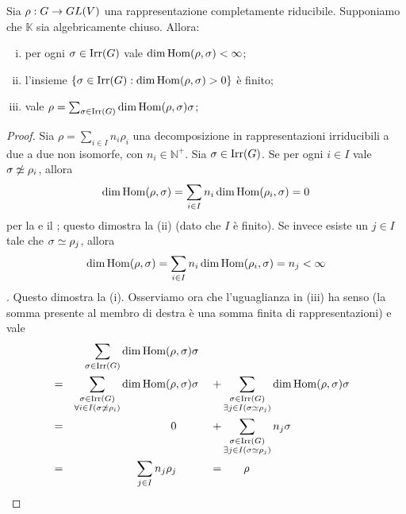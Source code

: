 \begin{proposition}
Sia $\rho:G\to GL(V)$ una rappresentazione completamente riducibile. Supponiamo che $\mathbb{K}$ sia algebricamente chiuso. Allora:
\begin{enumerate}[(i)]
\item per ogni $\sigma\in\operatorname{Irr}(G)$ vale $\dim\operatorname{Hom}(\rho,\sigma)<\infty$;
\item l'insieme $\{\sigma\in\operatorname{Irr}(G):\dim\operatorname{Hom}(\rho,\sigma)>0\}$ è finito;
\item vale $\rho=\sum_{\sigma\in\operatorname{Irr}(G)}\dim\operatorname{Hom}(\rho,\sigma)\sigma$;
\end{enumerate}
\end{proposition}
\begin{proof}
Sia $\rho=\sum_{i\in I}n_i\rho_i$ una decomposizione in rappresentazioni irriducibili a due a due non isomorfe, con $n_i\in\mathbb{N^+}$. Sia $\sigma\in\operatorname{Irr}(G)$. Se per ogni $i\in I$ vale $\sigma\not\simeq\rho_i$, allora
$$
\dim\operatorname{Hom}(\rho,\sigma)=\sum_{i\in I}n_i\dim\operatorname{Hom}(\rho_i,\sigma)=0
$$
per la  e il ; questo dimostra la (ii) (dato che $I$ è finito). Se invece esiste un $j\in I$ tale che $\sigma\simeq\rho_j$, allora
$$
\dim\operatorname{Hom}(\rho,\sigma)=\sum_{i\in I}n_i\dim\operatorname{Hom}(\rho_i,\sigma)=n_j<\infty
$$
. Questo dimostra la (i). Osserviamo ora che l'uguaglianza in (iii) ha senso (la somma presente al membro di destra è una somma finita di rappresentazioni) e vale
\begin{alignat*}{3}
&&\sum_{\sigma\in\operatorname{Irr}(G)}\dim\operatorname{Hom}(\rho,\sigma)\sigma\\
&=&\sum_{\substack{\sigma\in\operatorname{Irr}(G)\\\forall i\in I(\sigma\not\simeq\rho_i)}}\dim\operatorname{Hom}(\rho,\sigma)\sigma
&\;&+&\sum_{\substack{\sigma\in\operatorname{Irr}(G)\\\exists j\in I(\sigma\simeq\rho_j)}}\dim\operatorname{Hom}(\rho,\sigma)\sigma\\
&=&0\qquad&&+&\sum_{\substack{\sigma\in\operatorname{Irr}(G)\\\exists j\in I(\sigma\simeq\rho_j)}}n_j\sigma\\
&=&\sum_{j\in I}n_j\rho_j\qquad&&=&\qquad\rho
\end{alignat*}
\end{proof}

